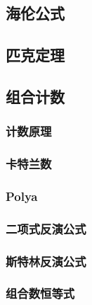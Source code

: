 \documentclass[twocolumn,a4]{article}
\newcommand{\addcpp}[1]{}
\begin{document}
	\subsection{海伦公式}
	\subsection{匹克定理}
	\subsection{组合计数}
		\subsubsection{计数原理}
		\subsubsection{卡特兰数}
		\subsubsection{Polya}
		\subsubsection{二项式反演公式}
		\subsubsection{斯特林反演公式}
		\subsubsection{组合数恒等式}
			
\end{document}
